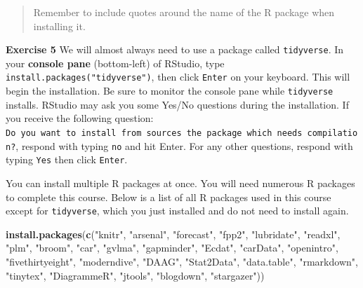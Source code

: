 \documentclass[
]{book}
\makeatletter
\newenvironment{Shaded}{\begin{snugshade}}{\end{snugshade}}
\newcommand{\FunctionTok}[1]{\textcolor[rgb]{0.27,0.27,0.27}{\textbf{#1}}}
\newcommand{\NormalTok}[1]{#1}
\newcommand{\StringTok}[1]{\textcolor[rgb]{0.5,0.5,0.5}{#1}}
\newenvironment{kframe}{%
\medskip{}
\setlength{\fboxsep}{.8em}
 \def\at@end@of@kframe{}%
 \ifinner\ifhmode%
  \def\at@end@of@kframe{\end{minipage}}%
  \begin{minipage}{\columnwidth}%
 \fi\fi%
 \def\FrameCommand##1{\hskip\@totalleftmargin \hskip-\fboxsep
 \colorbox{shadecolor}{##1}\hskip-\fboxsep
     \hskip-\linewidth \hskip-\@totalleftmargin \hskip\columnwidth}%
 \MakeFramed {\advance\hsize-\width
   \@totalleftmargin\z@ \linewidth\hsize
   \@setminipage}}%
 {\par\unskip\endMakeFramed%
 \at@end@of@kframe}
\renewenvironment{Shaded}{\begin{kframe}}{\end{kframe}}
\newenvironment{rmdblock}[1]
  {\begin{shaded*}
  }
  {\end{shaded*}
  }
\newenvironment{learncheck}
  {\begin{rmdblock}{warning}}
  {\end{rmdblock}}
\makeatother
\begin{document}
\begin{quote}
Remember to include quotes around the name of the R package when installing it.
\end{quote}

\begin{learncheck}
\textbf{Exercise 5} We will almost always need to use a package called
\texttt{tidyverse}. In your \textbf{console pane} (bottom-left) of
RStudio, type \texttt{install.packages("tidyverse")}, then click
\texttt{Enter} on your keyboard. This will begin the installation. Be
sure to monitor the console pane while \texttt{tidyverse} installs.
RStudio may ask you some Yes/No questions during the installation. If
you receive the following question:
\texttt{Do\ you\ want\ to\ install\ from\ sources\ the\ package\ which\ needs\ compilation?},
respond with typing \texttt{no} and hit Enter. For any other questions,
respond with typing \texttt{Yes} then click \texttt{Enter}.
\end{learncheck}

You can install multiple R packages at once. You will need numerous R packages to complete this course. Below is a list of all R packages used in this course except for \texttt{tidyverse}, which you just installed and do not need to install again.

\begin{Shaded}
\begin{Highlighting}[]
\FunctionTok{install.packages}\NormalTok{(}\FunctionTok{c}\NormalTok{(}\StringTok{"knitr"}\NormalTok{,}
                   \StringTok{"arsenal"}\NormalTok{,}
                   \StringTok{"forecast"}\NormalTok{,}
                   \StringTok{"fpp2"}\NormalTok{,}
                   \StringTok{"lubridate"}\NormalTok{,}
                   \StringTok{"readxl"}\NormalTok{,}
                   \StringTok{"plm"}\NormalTok{,}
                   \StringTok{"broom"}\NormalTok{,}
                   \StringTok{"car"}\NormalTok{,}
                   \StringTok{"gvlma"}\NormalTok{,}
                   \StringTok{"gapminder"}\NormalTok{,}
                   \StringTok{"Ecdat"}\NormalTok{,}
                   \StringTok{"carData"}\NormalTok{,}
                   \StringTok{"openintro"}\NormalTok{,}
                   \StringTok{"fivethirtyeight"}\NormalTok{,}
                   \StringTok{"moderndive"}\NormalTok{,}
                   \StringTok{"DAAG"}\NormalTok{,}
                   \StringTok{"Stat2Data"}\NormalTok{,}
                   \StringTok{"data.table"}\NormalTok{,}
                   \StringTok{"rmarkdown"}\NormalTok{,}
                   \StringTok{"tinytex"}\NormalTok{,}
                   \StringTok{"DiagrammeR"}\NormalTok{,}
                   \StringTok{"jtools"}\NormalTok{,}
                   \StringTok{"blogdown"}\NormalTok{,}
                   \StringTok{"stargazer"}\NormalTok{))}
\end{Highlighting}
\end{Shaded}
\end{document}

